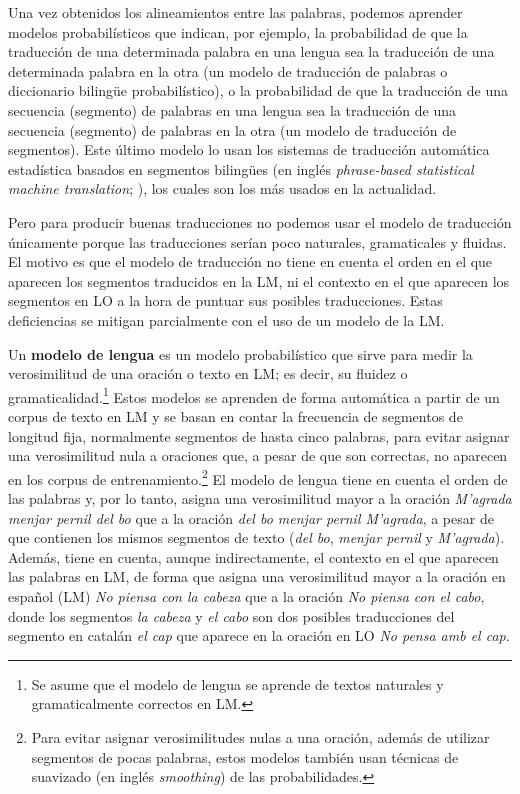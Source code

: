 Una vez obtenidos los alineamientos entre las palabras, podemos aprender modelos probabilísticos que indican, por ejemplo, la probabilidad de que la traducción de una determinada palabra en una lengua sea la traducción de una determinada palabra en la otra (un modelo de traducción de palabras o diccionario bilingüe probabilístico), o la probabilidad de que la traducción de una secuencia (segmento) de palabras en una lengua sea la traducción de una secuencia (segmento) de palabras en la otra (un modelo de traducción de segmentos). Este último modelo lo usan los sistemas de traducción automática estadística basados en segmentos bilingües (en inglés \emph{phrase-based statistical machine translation}; \cite{koehnbook}), los cuales son los más usados en la actualidad. 

Pero para producir buenas traducciones no podemos usar el modelo de traducción únicamente porque las traducciones serían poco naturales, gramaticales y fluidas. El motivo es que el modelo de traducción no tiene en cuenta el orden en el que aparecen los segmentos traducidos en la LM, ni el contexto en el que aparecen los segmentos en LO a la hora de puntuar sus posibles traducciones. Estas deficiencias se mitigan parcialmente con el uso de un modelo de la LM. 

Un \textbf{modelo de lengua} es un modelo probabilístico que sirve para medir la verosimilitud de una oración o texto en LM; es decir, su fluidez o gramaticalidad.\footnote{Se asume que el modelo de lengua se aprende de textos naturales y gramaticalmente correctos en LM.} Estos modelos se aprenden de forma automática a partir de un corpus de texto en LM y se basan en contar la frecuencia de segmentos de longitud fija, normalmente segmentos de hasta cinco palabras, para evitar asignar una verosimilitud nula a oraciones que, a pesar de que son correctas, no aparecen en los corpus de entrenamiento.\footnote{Para evitar asignar verosimilitudes nulas a una oración, además de utilizar segmentos de pocas palabras, estos modelos también usan técnicas de suavizado (en inglés \emph{smoothing}) de las probabilidades.} El modelo de lengua tiene en cuenta el orden de las palabras y, por lo tanto, asigna una verosimilitud mayor a la oración \emph{M'agrada menjar pernil del bo} que a la oración \emph{del bo menjar pernil M'agrada}, a pesar de que contienen los mismos segmentos de texto (\emph{del bo}, \emph{menjar pernil} y \emph{M'agrada}). Además, tiene en cuenta, aunque	 indirectamente, el contexto en el que aparecen las palabras en LM, de forma que asigna una verosimilitud mayor a la oración en español (LM) \emph{No piensa con la cabeza} que a la oración \emph{No piensa con el cabo}, donde los segmentos \emph{la cabeza} y \emph{el cabo} son dos posibles traducciones del segmento en catalán \emph{el cap} que aparece en la oración en LO \emph{No pensa amb el cap}. 

